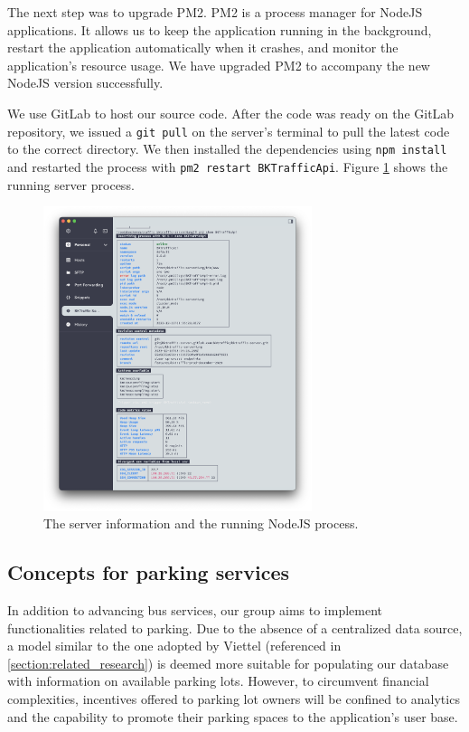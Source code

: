The next step was to upgrade PM2. PM2 is a process manager for NodeJS applications. It allows us to keep the application running in the background, restart the application automatically when it crashes, and monitor the application's resource usage. We have upgraded PM2 to accompany the new NodeJS version successfully.

We use GitLab to host our source code. After the code was ready on the GitLab repository, we issued a \lstinline{git pull} on the server's terminal to pull the latest code to the correct directory. We then installed the dependencies using \lstinline{npm install} and restarted the process with \lstinline{pm2 restart BKTrafficApi}. Figure \ref{fig:pm2_show} shows the running server process.

\begin{figure}[H]
    \centering
    \includegraphics[width=0.7\textwidth]{assets/images/Implementation/pm2_show.png}
    \caption{The server information and the running NodeJS process.}
    \label{fig:pm2_show}
\end{figure}

\subsection{Concepts for parking services}

In addition to advancing bus services, our group aims to implement functionalities related to parking. Due to the absence of a centralized data source, a model similar to the one adopted by Viettel (referenced in \ref{section:related_research}) is deemed more suitable for populating our database with information on available parking lots. However, to circumvent financial complexities, incentives offered to parking lot owners will be confined to analytics and the capability to promote their parking spaces to the application's user base.

